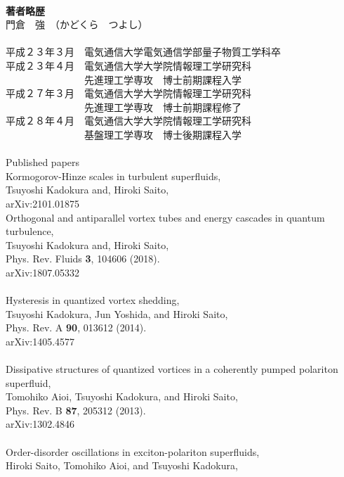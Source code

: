 \documentclass[12pt,a4paper]{jbook}
\begin{document}
	\newpage
	\
	\\
	{\bf 著者略歴}
	\\
	門倉　強　（かどくら　つよし）
	\\
	\\
	平成２３年３月　電気通信大学電気通信学部量子物質工学科卒
	\\
	平成２３年４月　電気通信大学大学院情報理工学研究科
	\\
	　　　　　　　　先進理工学専攻　博士前期課程入学
	\\
	平成２７年３月　電気通信大学大学院情報理工学研究科
	\\
	　　　　　　　　先進理工学専攻　博士前期課程修了
	\\
	平成２８年４月　電気通信大学大学院情報理工学研究科
	\\
	　　　　　　　　基盤理工学専攻　博士後期課程入学
	\\
	\\
		Published papers
		\\
		Kormogorov-Hinze scales in turbulent superfluids,
		\\
		Tsuyoshi Kadokura and, Hiroki Saito,
		\\
		arXiv:2101.01875
		\\
		Orthogonal and antiparallel vortex tubes and energy cascades
		in quantum turbulence,
		\\
		Tsuyoshi Kadokura and, Hiroki Saito,
		\\
		Phys. Rev. Fluids {\bf 3}, 104606 (2018).
		\\
		arXiv:1807.05332
		\\
		\\
		Hysteresis in quantized vortex shedding,
		\\
		Tsuyoshi Kadokura, Jun Yoshida, and Hiroki Saito,
		\\
		Phys. Rev. A {\bf 90}, 013612 (2014).
		\\
		arXiv:1405.4577
		\\
		\\
		Dissipative structures of quantized vortices in a coherently pumped polariton superfluid,
		\\
		Tomohiko Aioi, Tsuyoshi Kadokura, and Hiroki Saito,
		\\
		Phys. Rev. B {\bf 87}, 205312 (2013).
		\\
		arXiv:1302.4846
		\\
		\\
		Order-disorder oscillations in exciton-polariton superfluids,
		\\
		Hiroki Saito, Tomohiko Aioi, and Tsuyoshi Kadokura,
\end{document}
